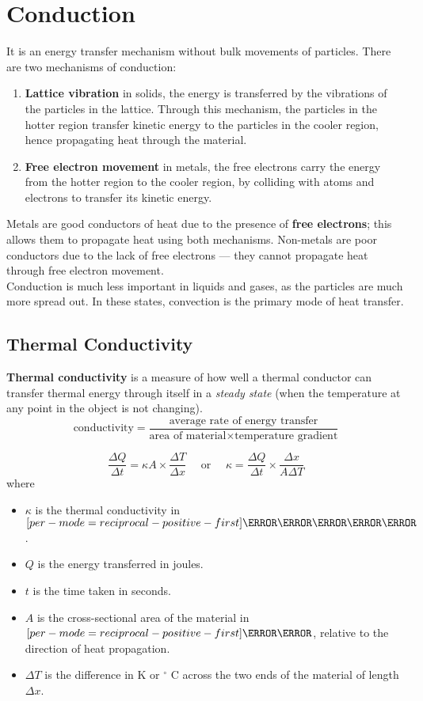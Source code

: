 \documentclass[a4paper,12pt]{article}
\let\oldsection\section
\renewcommand\section{\clearpage\oldsection}
\let\oldsi\si
\renewcommand{\si}[1]{\oldsi[per-mode=reciprocal-positive-first]{#1}}
\newcommand{\degsym}{^{\circ}}
\newcommand{\lb}{\\[8pt]}
\begin{document}
\section{Conduction}

It is an energy transfer mechanism without bulk movements of particles. There are two mechanisms of conduction:
\begin{enumerate}
  \item \textbf{Lattice vibration} in solids, the energy is transferred by the vibrations of the particles in the lattice. Through this mechanism, the particles in the hotter region transfer kinetic energy to the particles in the cooler region, hence propagating heat through the material.
  \item \textbf{Free electron movement} in metals, the free electrons carry the energy from the hotter region to the cooler region, by colliding with atoms and electrons to transfer its kinetic energy.
\end{enumerate}

Metals are good conductors of heat due to the presence of \textbf{free electrons}; this allows them to propagate heat using both mechanisms. Non-metals are poor conductors due to the lack of free electrons --- they cannot propagate heat through free electron movement.\lb
Conduction is much less important in liquids and gases, as the particles are much more spread out. In these states, convection is the primary mode of heat transfer.


\subsection{Thermal Conductivity}

\textbf{Thermal conductivity} is a measure of how well a thermal conductor can transfer thermal energy through itself in a \textit{steady state} (when the temperature at any point in the object is not changing).
$$\text{conductivity} = \frac{\text{average rate of energy transfer}}{\text{area of material}\times\text{temperature gradient}}$$

\pagebreak

$$\frac{\Delta Q}{\Delta t} = \kappa A\times \frac{\Delta T}{\Delta x}\quad \text{ or } \quad \kappa = \frac{\Delta Q}{\Delta t}\times\frac{\Delta x}{A\Delta T}$$
where
\begin{itemize}
  \item $\kappa$ is the thermal conductivity in $\si{\watt\per\meter\per\kelvin}$.
  \item $Q$ is the energy transferred in joules.
  \item $t$ is the time taken in seconds.
  \item $A$ is the cross-sectional area of the material in $\si{\meter\squared}$, relative to the direction of heat propagation.
  \item ${\Delta T}$ is the difference in K or $\degsym$ C across the two ends of the material of length $\Delta x$.
\end{itemize}
\end{document}
